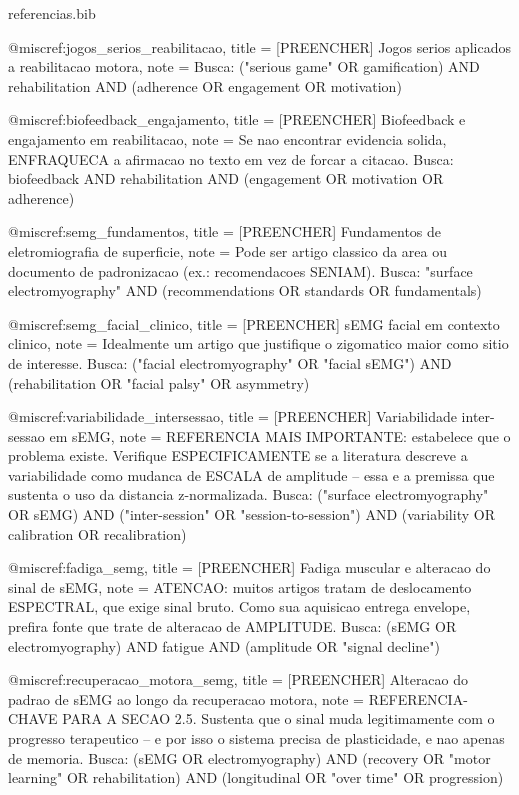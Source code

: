 \begin{filecontents*}[overwrite]{referencias.bib}

@misc{ref:jogos_serios_reabilitacao,
  title = {[PREENCHER] Jogos serios aplicados a reabilitacao motora},
  note  = {Busca: ("serious game" OR gamification) AND rehabilitation
           AND (adherence OR engagement OR motivation)}
}

@misc{ref:biofeedback_engajamento,
  title = {[PREENCHER] Biofeedback e engajamento em reabilitacao},
  note  = {Se nao encontrar evidencia solida, ENFRAQUECA a afirmacao no
           texto em vez de forcar a citacao.
           Busca: biofeedback AND rehabilitation AND (engagement OR
           motivation OR adherence)}
}

@misc{ref:semg_fundamentos,
  title = {[PREENCHER] Fundamentos de eletromiografia de superficie},
  note  = {Pode ser artigo classico da area ou documento de
           padronizacao (ex.: recomendacoes SENIAM).
           Busca: "surface electromyography" AND (recommendations OR
           standards OR fundamentals)}
}

@misc{ref:semg_facial_clinico,
  title = {[PREENCHER] sEMG facial em contexto clinico},
  note  = {Idealmente um artigo que justifique o zigomatico maior como
           sitio de interesse.
           Busca: ("facial electromyography" OR "facial sEMG") AND
           (rehabilitation OR "facial palsy" OR asymmetry)}
}

@misc{ref:variabilidade_intersessao,
  title = {[PREENCHER] Variabilidade inter-sessao em sEMG},
  note  = {REFERENCIA MAIS IMPORTANTE: estabelece que o problema
           existe. Verifique ESPECIFICAMENTE se a literatura descreve a
           variabilidade como mudanca de ESCALA de amplitude -- essa e
           a premissa que sustenta o uso da distancia z-normalizada.
           Busca: ("surface electromyography" OR sEMG) AND
           ("inter-session" OR "session-to-session") AND (variability
           OR calibration OR recalibration)}
}

@misc{ref:fadiga_semg,
  title = {[PREENCHER] Fadiga muscular e alteracao do sinal de sEMG},
  note  = {ATENCAO: muitos artigos tratam de deslocamento ESPECTRAL,
           que exige sinal bruto. Como sua aquisicao entrega envelope,
           prefira fonte que trate de alteracao de AMPLITUDE.
           Busca: (sEMG OR electromyography) AND fatigue AND (amplitude
           OR "signal decline")}
}

@misc{ref:recuperacao_motora_semg,
  title = {[PREENCHER] Alteracao do padrao de sEMG ao longo da
           recuperacao motora},
  note  = {REFERENCIA-CHAVE PARA A SECAO 2.5. Sustenta que o sinal muda
           legitimamente com o progresso terapeutico -- e por isso o
           sistema precisa de plasticidade, e nao apenas de memoria.
           Busca: (sEMG OR electromyography) AND (recovery OR
           "motor learning" OR rehabilitation) AND (longitudinal OR
           "over time" OR progression)}
}


\end{filecontents*}
